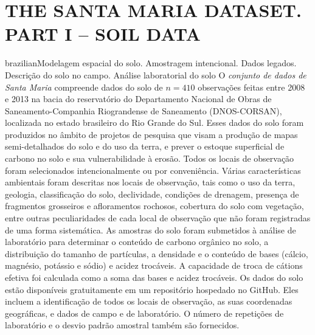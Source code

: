 \artigotrue
\chapter{THE SANTA MARIA DATASET. PART I -- SOIL DATA}
\label{chap:chap04}


\def\ptkeys{Modelagem espacial do solo. Amostragem intencional. Dados legados. Descrição do solo no campo. 
Análise laboratorial do solo}
\begin{chapterabstract}{brazilian}{\ptkeys}
O \emph{conjunto de dados de Santa Maria} compreende dados do solo de $n = 410$  observações feitas entre 
2008 e 2013 na bacia do reservatório do Departamento Nacional de Obras de Saneamento-Companhia Riograndense de 
Saneamento (DNOS-CORSAN), localizada no estado brasileiro do Rio Grande do Sul. Esses dados do solo foram 
produzidos no âmbito de projetos de pesquisa que visam a produção de mapas semi-detalhados do solo e do
uso da terra, e prever o estoque superficial de carbono no solo e sua vulnerabilidade à erosão. Todos os 
locais de observação foram selecionados intencionalmente ou por conveniência. Várias características 
ambientais foram descritas nos locais de observação, tais como o uso da terra, geologia, classificação do 
solo, declividade, condições de drenagem, presença de fragmentos grosseiros e afloramentos rochosos, cobertura 
do solo com vegetação, entre outras peculiaridades de cada local de observação que não foram registradas de 
uma forma sistemática. As amostras do solo foram submetidos à análise de laboratório para determinar o 
conteúdo de carbono orgânico no solo, a distribuição do tamanho de partículas, a densidade e o conteúdo de 
bases (cálcio, magnésio, potássio e sódio) e acidez trocáveis. A capacidade de troca de cátions efetiva foi 
calculada como a soma das bases e acidez trocáveis. Os dados do solo estão disponíveis gratuitamente em um 
repositório hospedado no GitHub. Eles incluem a identificação de todos os locais de observação, as suas 
coordenadas geográficas, e dados de campo e de laboratório. O número de repetições de laboratório e o desvio 
padrão amostral também são fornecidos.

\end{chapterabstract}

